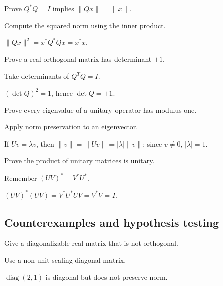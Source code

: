 \begin{exercise}\label{exr:i15-expand-06}
Prove \(Q^*Q=I\) implies \(\|Qx\|=\|x\|\).
\end{exercise}
\begin{hint}
Compute the squared norm using the inner product.
\end{hint}
\begin{solution}
\(\|Qx\|^2=x^*Q^*Qx=x^*x\).
\end{solution}

\begin{exercise}\label{exr:i15-expand-07}
Prove a real orthogonal matrix has determinant \(\pm1\).
\end{exercise}
\begin{hint}
Take determinants of \(Q^TQ=I\).
\end{hint}
\begin{solution}
\((\det Q)^2=1\), hence \(\det Q=\pm1\).
\end{solution}

\begin{exercise}\label{exr:i15-expand-08}
Prove every eigenvalue of a unitary operator has modulus one.
\end{exercise}
\begin{hint}
Apply norm preservation to an eigenvector.
\end{hint}
\begin{solution}
If \(Uv=\lambda v\), then \(\|v\|=\|Uv\|=|\lambda|\|v\|\); since \(v\ne0\), \(|\lambda|=1\).
\end{solution}

\begin{exercise}\label{exr:i15-expand-09}
Prove the product of unitary matrices is unitary.
\end{exercise}
\begin{hint}
Remember \((UV)^*=V^*U^*\).
\end{hint}
\begin{solution}
\((UV)^*(UV)=V^*U^*UV=V^*V=I\).
\end{solution}

\subsection*{Counterexamples and hypothesis testing}

\begin{exercise}\label{exr:i15-expand-10}
Give a diagonalizable real matrix that is not orthogonal.
\end{exercise}
\begin{hint}
Use a non-unit scaling diagonal matrix.
\end{hint}
\begin{solution}
\(\operatorname{diag}(2,1)\) is diagonal but does not preserve norm.
\end{solution}

